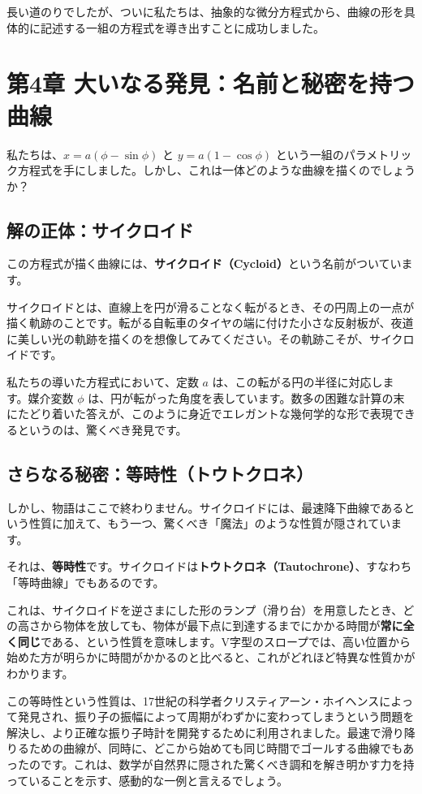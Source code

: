 \documentclass[12pt,a4paper]{ltjsarticle}
\begin{document}
長い道のりでしたが、ついに私たちは、抽象的な微分方程式から、曲線の形を具体的に記述する一組の方程式を導き出すことに成功しました。

\section{第4章 大いなる発見：名前と秘密を持つ曲線}

私たちは、$x = a(\phi - \sin\phi)$ と $y = a(1 - \cos\phi)$ という一組のパラメトリック方程式を手にしました。しかし、これは一体どのような曲線を描くのでしょうか？

\subsection{解の正体：サイクロイド}

この方程式が描く曲線には、\textbf{サイクロイド（Cycloid）}という名前がついています。

サイクロイドとは、直線上を円が滑ることなく転がるとき、その円周上の一点が描く軌跡のことです。転がる自転車のタイヤの端に付けた小さな反射板が、夜道に美しい光の軌跡を描くのを想像してみてください。その軌跡こそが、サイクロイドです。

私たちの導いた方程式において、定数 $a$ は、この転がる円の半径に対応します。媒介変数 $\phi$ は、円が転がった角度を表しています。数多の困難な計算の末にたどり着いた答えが、このように身近でエレガントな幾何学的な形で表現できるというのは、驚くべき発見です。

\subsection{さらなる秘密：等時性（トウトクロネ）}

しかし、物語はここで終わりません。サイクロイドには、最速降下曲線であるという性質に加えて、もう一つ、驚くべき「魔法」のような性質が隠されています。

それは、\textbf{等時性}です。サイクロイドは\textbf{トウトクロネ（Tautochrone）}、すなわち「等時曲線」でもあるのです。

これは、サイクロイドを逆さまにした形のランプ（滑り台）を用意したとき、どの高さから物体を放しても、物体が最下点に到達するまでにかかる時間が\textbf{常に全く同じ}である、という性質を意味します。V字型のスロープでは、高い位置から始めた方が明らかに時間がかかるのと比べると、これがどれほど特異な性質かがわかります。

この等時性という性質は、17世紀の科学者クリスティアーン・ホイヘンスによって発見され、振り子の振幅によって周期がわずかに変わってしまうという問題を解決し、より正確な振り子時計を開発するために利用されました。最速で滑り降りるための曲線が、同時に、どこから始めても同じ時間でゴールする曲線でもあったのです。これは、数学が自然界に隠された驚くべき調和を解き明かす力を持っていることを示す、感動的な一例と言えるでしょう。
\end{document}
